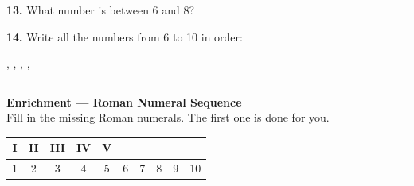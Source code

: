 \documentclass[12pt, letterpaper]{article}
\newcommand{\answerline}{\underline{\hspace{2.5cm}}}
\newcommand{\numbox}{\fbox{\hspace{0.6cm}\vphantom{0}}}
\begin{document}
\bigskip
\noindent\textbf{13.} What number is between 6 and 8? \hfill \answerline

\bigskip
\noindent\textbf{14.} Write all the numbers from 6 to 10 in order:

\medskip
\hspace{2em}\numbox \; , \; \numbox \; , \; \numbox \; , \; \numbox \; , \; \numbox

\bigskip
\noindent\textcolor{scholared}{\rule{\linewidth}{0.4pt}}

\begin{lessonbox}
\textcolor{scholared}{\textbf{Enrichment — Roman Numeral Sequence}}\\[6pt]
\noindent Fill in the missing Roman numerals. The first one is done for you.\\[8pt]
\begin{center}
\renewcommand{\arraystretch}{1.6}
\begin{tabular}{|c|c|c|c|c|c|c|c|c|c|}
\hline
\textbf{I} & \textbf{II} & \textbf{III} & \textbf{IV} & \textbf{V} & \fbox{\hspace{0.5cm}} & \fbox{\hspace{0.5cm}} & \fbox{\hspace{0.5cm}} & \fbox{\hspace{0.5cm}} & \fbox{\hspace{0.5cm}} \\
\hline
1 & 2 & 3 & 4 & 5 & 6 & 7 & 8 & 9 & 10 \\
\hline
\end{tabular}
\end{center}
\end{lessonbox}
\end{document}
